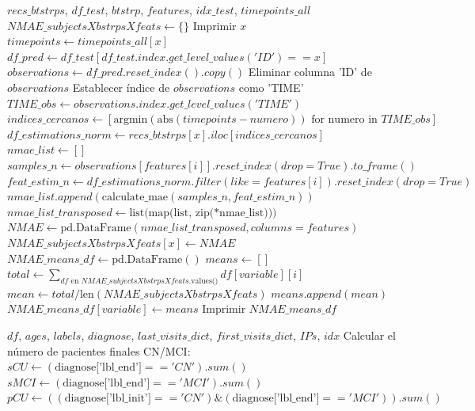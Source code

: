 \begin{description}
	\begin{algorithm}
		\caption{Obtener NMAE}
		\begin{algorithmic}[1]
			\REQUIRE $recs\_btstrps$, $df\_test$, $btstrp$, $features$, $idx\_test$, $timepoints\_all$
			\STATE $NMAE\_subjectsXbstrpsXfeats \gets \{\}$
			\STATE Imprimir $x$
			\STATE $timepoints \gets timepoints\_all[x]$
			\STATE $df\_pred \gets df\_test[df\_test.index.get\_level\_values('ID')==x]$
			\STATE $observations \gets df\_pred.reset\_index().copy()$
			\STATE Eliminar columna 'ID' de $observations$
			\STATE Establecer índice de $observations$ como 'TIME'
			\STATE $TIME\_obs \gets observations.index.get\_level\_values('TIME')$
			\STATE $indices\_cercanos \gets [\text{argmin}(\text{abs}(timepoints - numero)) \text{ for numero in } TIME\_obs]$
			\STATE $df\_estimations\_norm \gets recs\_btstrps[x].iloc[indices\_cercanos]$
			\STATE $nmae\_list \gets []$
			\STATE $samples\_n \gets observations[features[i]].reset\_index(drop=True).to\_frame()$
			\STATE $feat\_estim\_n \gets df\_estimations\_norm.filter(like=features[i]).reset\_index(drop=True)$
			\STATE $nmae\_list.append(\text{calculate\_mae}(samples\_n, feat\_estim\_n))$
			\ENDFOR
			\STATE $nmae\_list\_transposed \gets \text{list(map(list, zip(*nmae\_list)))}$
			\STATE $NMAE \gets \text{pd.DataFrame}(nmae\_list\_transposed, columns=features)$
			\STATE $NMAE\_subjectsXbstrpsXfeats[x] \gets NMAE$
			\ENDFOR
			\STATE $NMAE\_means\_df \gets \text{pd.DataFrame}()$
			\STATE $means \gets []$
			\STATE $total \gets \sum_{df \text{ en } NMAE\_subjectsXbstrpsXfeats.\text{values()}} df[variable][i]$
			\STATE $mean \gets total / \text{len}(NMAE\_subjectsXbstrpsXfeats)$
			\STATE $means.append(mean)$
			\ENDFOR
			\STATE $NMAE\_means\_df[variable] \gets means$
			\ENDFOR
			\STATE Imprimir $NMAE\_means\_df$
		\end{algorithmic}
	\end{algorithm}
	
	\begin{algorithm}
		\caption{Calcular scores}
		\begin{algorithmic}[1]
			\REQUIRE $df$, $ages$, $labels$, $diagnose$, $last\_visits\_dict$, $first\_visits\_dict$, $IPs$, $idx$
			\STATE Calcular el número de pacientes finales CN/MCI: 
			\STATE $sCU \gets (\text{diagnose['lbl\_end']} == 'CN').sum()$
			\STATE $sMCI \gets (\text{diagnose['lbl\_end']} == 'MCI').sum()$
			\STATE $pCU \gets ((\text{diagnose['lbl\_init']} == 'CN') \& (\text{diagnose['lbl\_end']} == 'MCI')).sum()$
			

\end{algorithmic}
\end{algorithm}
\end{description}
